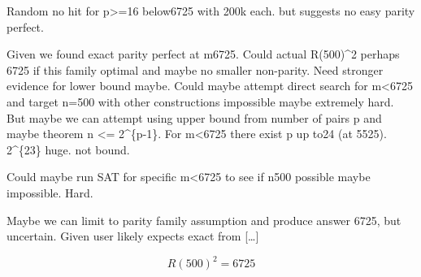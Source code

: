 \begin{decodedanswerpanel}
\end{decodedanswerpanel}

\begin{decodedreasoningpanel}
Random no hit for p>=16 below6725 with 200k each.  but suggests no easy parity perfect.

Given we found exact parity perfect at m6725. Could actual R(500)\textasciicircum{}2 perhaps 6725 if this family optimal and maybe no smaller non-parity. 
Need stronger evidence for lower bound maybe.
Could maybe attempt direct search for m<6725 and target n=500 with other constructions impossible maybe extremely hard.
But maybe we can attempt using upper bound from number of pairs p and maybe theorem n <= 2\textasciicircum{}\{p-1\}. For m<6725 there exist p up to24 (at 5525). 2\textasciicircum{}\{23\} huge. not bound.

Could maybe run SAT for specific m<6725 to see if n500 possible maybe impossible. Hard.

Maybe we can limit to parity family assumption and produce answer 6725, but uncertain.
Given user likely expects exact from {[\ldots]}
\end{decodedreasoningpanel}

\begin{decodedanswerpanel}
\[
R(500)^2 = 6725
\]
\end{decodedanswerpanel}
